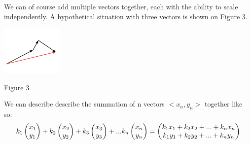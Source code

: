 \documentclass{article}
\begin{document}
\linebreak
\linebreak
\linebreak
\begin{minipage}[c]{.5\linewidth}
	\par \noindent We can of course add multiple vectors together, each with the ability to scale independently. A hypothetical situation with three vectors is shown on Figure 3.
\end{minipage}%
\begin{minipage}[c]{.5\linewidth}
\begin{center}
	\includegraphics[width=3cm]{matrix-scaling-3.png}
\end{center}
\begin{center}
	Figure 3
\end{center}
\end{minipage}
\newline
\newline
\newline
\par \noindent We can describe describe the summation of n vectors \(<x_n, y_n>\) together like so:
\[
k_1
\left(\begin{array}{@{}c@{}}
	x_1 \\
	y_1 \\
\end{array}\right) + 
k_2
\left(\begin{array}{@{}c@{}}
	x_2 \\
	y_2 \\
\end{array}\right) + 
k_3
\left(\begin{array}{@{}c@{}}
	x_3 \\
	y_3 \\
\end{array}\right) + 
... 
k_n
\left(\begin{array}{@{}c@{}}
	x_n \\
	y_n \\
\end{array}\right) =
\left(\begin{array}{@{}c@{}}
	k_1 x_1 + k_2 x_2 + ... + k_n x_n \\
	k_1 y_1 + k_2 y_2 + ... + k_n y_n \\
\end{array}\right) 
\]
\end{document}
